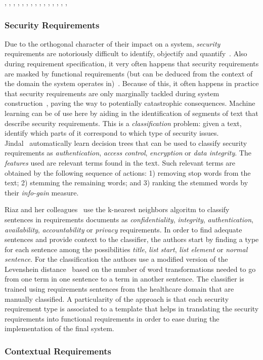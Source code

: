 \cite{Deocadez:2017}, \cite{Kurtanovic:2017}, \cite{Guzman:2017},
\cite{Abad:2017}, \cite{Dekhtyar:2017}, \cite{Rashwan:2012}, \cite{Lu:2017},
\cite{Hayes:2014}, \cite{Williams:2017}, \cite{Garzoli:2013},
\cite{Casamayor:2010}, \cite{Wang:2016}, \cite{Hussain:2012}, \cite{Jiang:2014},
\cite{Jha:2017}, \cite{Pinquie:2015}

\subsubsection{Security Requirements} 

Due to the orthogonal character of their impact on a system, \emph{security}
requirements are notoriously difficult to identify, objectify and
quantify~\cite{}. Also during requirement specification, it very often happens
that security requirements are masked by functional requirements (but can be
deduced from the context of the domain the system operates in)~\cite{Riaz:2014}.
Because of this, it often happens in practice that security requirements are
only marginally tackled during system construction~\cite{}, paving the way to
potentially catastrophic consequences.
Machine learning can be of use here by aiding in the identification of segments
of text that describe security requirements. This is a \emph{classification}
problem: given a text, identify which parts of it correspond to which type of
security issues.\\

Jindal\etal~\cite{Jildal:2016} automatically learn decision trees that can be
used to classify security requirements as \emph{authentication}, \emph{access
control}, \emph{encryption} or \emph{data integrity}. The \emph{features} used
are relevant terms found in the text. Such relevant terms are obtained by the
following sequence of actions: 1) removing stop words from the text; 2) stemming
the remaining words; and 3) ranking the stemmed words by their \emph{info-gain}
measure.

Riaz and her colleagues~\cite{Riaz:2014} use the k-nearest neighbors algoritm to
classify sentences in requirements documents as \emph{confidentiality},
\emph{integrity}, \emph{authentication}, \emph{availability},
\emph{accountability} or \emph{privacy} requirements. In order to find adequate
sentences and provide context to the classifier, the authors start by finding a
type for each sentence among the possibilities \emph{title}, \emph{list start},
\emph{list element} or \emph{normal sentence}. For the classification the
authors use a modified version of the Levenshein distance~\cite{} based
on the number of word transformations needed to go from one term in one sentence to a term in
another sentence. The classifier is trained using requirements sentences from
the healthcare domain that are manually classified. A particularity of the
approach is that each security requirement type is associated to a template that
helps in translating the security requirements into functional requirements in
order to ease during the implementation of the final system.


\cite{Knauss:2011} 

\subsubsection{Contextual Requirements} 

